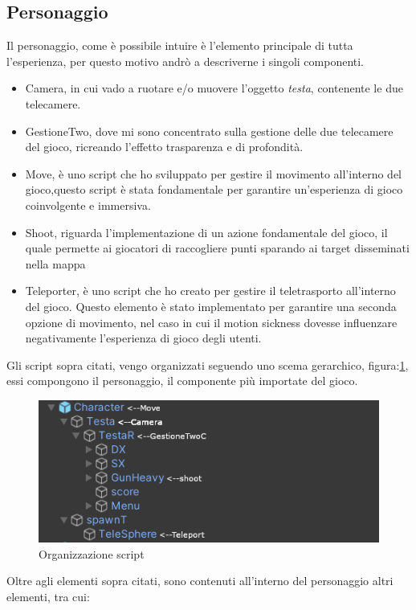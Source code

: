 \documentclass[
a4paper,
cleardoublepage=empty,
headings=twolinechapter,
numbers=autoenddot,
]{scrbook}
\begin{document}
    \subsection{Personaggio}
    Il personaggio, come è possibile intuire è l'elemento principale di tutta l'esperienza, per questo motivo andrò a descriverne i singoli componenti.
    \begin{itemize}
        \item Camera, in cui vado a ruotare e/o muovere l'oggetto \textit{testa}, contenente le due telecamere.
        \item GestioneTwo, dove mi sono concentrato sulla gestione delle due telecamere del gioco, ricreando l'effetto trasparenza e di profondità.
        \item Move, è uno script che ho sviluppato per gestire il movimento all'interno del gioco,questo script è stata fondamentale per garantire un'esperienza di gioco coinvolgente e immersiva.
        \item Shoot, riguarda l'implementazione di un azione fondamentale del gioco, il quale permette ai giocatori di raccogliere punti sparando ai target disseminati nella mappa
        \item Teleporter, è uno script che ho creato per gestire il teletrasporto all'interno del gioco. Questo elemento è stato implementato per garantire una seconda opzione di movimento, nel caso in cui il motion sickness\cite{mottion_sickness} dovesse influenzare negativamente l'esperienza di gioco degli utenti.
    \end{itemize}
    Gli script sopra citati, vengo organizzati seguendo uno scema gerarchico, figura:\ref{fig:script_character}, essi compongono il personaggio, il componente più importate del gioco.
    \begin{figure}[H]
    	\centering
    	\includegraphics[width=0.8\linewidth]{image/script_character}
    	\caption{Organizzazione script}
    	\label{fig:script_character}
    \end{figure}
    Oltre agli elementi sopra citati, sono contenuti all'interno del personaggio altri elementi, tra cui:
\end{document}
